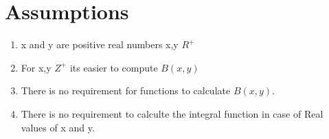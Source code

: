 \documentclass{article}
\begin{document}
\section*{Assumptions}
    \begin{enumerate}[noitemsep]
        \item x and y are positive real numbers x,y \in $R^+$
        \item For x,y \in $Z^+$ its easier to compute $B(x,y)$
        \item There is no requirement for functions to calculate $B(x,y)$.
        \item There is no requirement to calculte the integral function in case of Real values of x and y.
    \end{enumerate}
    
\end{document}
